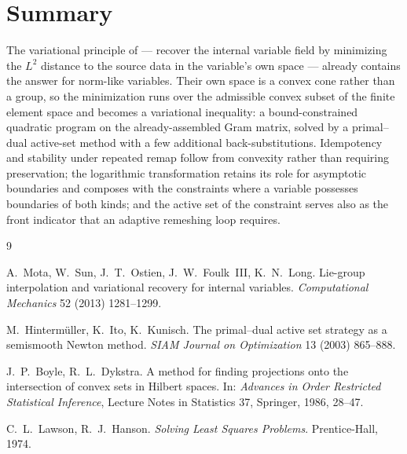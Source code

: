 \documentclass[11pt]{article}
\begin{document}
\section{Summary}

The variational principle of \cite{mota2013} --- recover the internal
variable field by minimizing the $L^2$ distance to the source data in the
variable's own space --- already contains the answer for norm-like
variables. Their own space is a convex cone rather than a group, so the
minimization runs over the admissible convex subset of the finite element
space and becomes a variational inequality: a bound-constrained quadratic
program on the already-assembled Gram matrix, solved by a primal--dual
active-set method with a few additional back-substitutions.
Idempotency and stability under repeated remap follow from convexity
rather than requiring preservation; the logarithmic transformation
retains its role for asymptotic boundaries and composes with the
constraints where a variable possesses boundaries of both kinds; and the
active set of the constraint serves also as the front indicator that an
adaptive remeshing loop requires.

\begin{thebibliography}{9}

A.~Mota, W.~Sun, J.~T.~Ostien, J.~W.~Foulk~III, K.~N.~Long.
Lie-group interpolation and variational recovery for internal variables.
\emph{Computational Mechanics} 52 (2013) 1281--1299.

M.~Hinterm\"uller, K.~Ito, K.~Kunisch.
The primal--dual active set strategy as a semismooth Newton method.
\emph{SIAM Journal on Optimization} 13 (2003) 865--888.

J.~P.~Boyle, R.~L.~Dykstra.
A method for finding projections onto the intersection of convex sets in
Hilbert spaces.
In: \emph{Advances in Order Restricted Statistical Inference},
Lecture Notes in Statistics 37, Springer, 1986, 28--47.

C.~L.~Lawson, R.~J.~Hanson.
\emph{Solving Least Squares Problems}.
Prentice-Hall, 1974.

\end{thebibliography}
\end{document}
